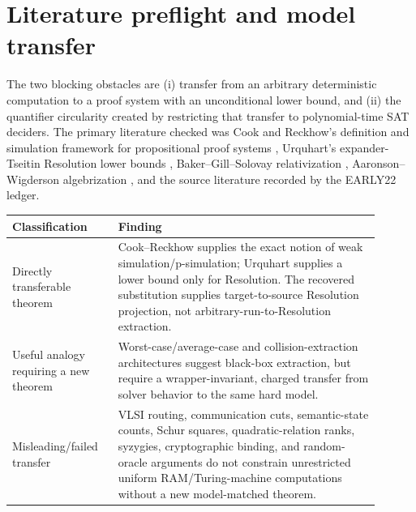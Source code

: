 \documentclass[11pt]{article}
\begin{document}
\section{Literature preflight and model transfer}
The two blocking obstacles are (i) transfer from an arbitrary deterministic
computation to a proof system with an unconditional lower bound, and (ii)
the quantifier circularity created by restricting that transfer to
polynomial-time SAT deciders.  The primary literature checked was Cook and
Reckhow's definition and simulation framework for propositional proof systems
\cite{CookReckhow1979}, Urquhart's expander-Tseitin Resolution lower bounds
\cite{Urquhart1987}, Baker--Gill--Solovay relativization
\cite{BakerGillSolovay1975}, Aaronson--Wigderson algebrization
\cite{AaronsonWigderson2009}, and the source literature recorded by the
EARLY22 ledger.

\begin{center}
\begin{tabular}{p{0.25\linewidth}p{0.65\linewidth}}
\toprule
Classification & Finding\\
\midrule
Directly transferable theorem & Cook--Reckhow supplies the exact notion of
weak simulation/p-simulation; Urquhart supplies a lower bound only for
Resolution.  The recovered substitution supplies target-to-source Resolution
projection, not arbitrary-run-to-Resolution extraction.\\
Useful analogy requiring a new theorem & Worst-case/average-case and
collision-extraction architectures suggest black-box extraction, but require
a wrapper-invariant, charged transfer from solver behavior to the same hard
model.\\
Misleading/failed transfer & VLSI routing, communication cuts, semantic-state
counts, Schur squares, quadratic-relation ranks, syzygies, cryptographic
binding, and random-oracle arguments do not constrain unrestricted uniform
RAM/Turing-machine computations without a new model-matched theorem.\\
\bottomrule
\end{tabular}
\end{center}
\end{document}
